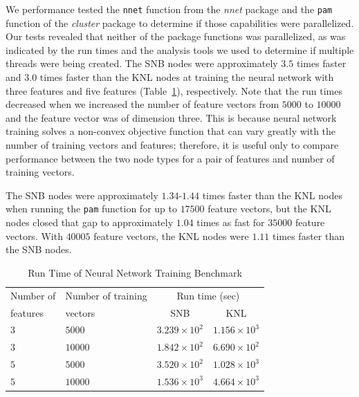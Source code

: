 We performance tested the \texttt{nnet} function from the \textit{nnet} package
  and the \texttt{pam} function of the \textit{cluster} package to determine if
  those capabilities were parallelized.
Our tests revealed that neither of the package functions was parallelized, as
  was indicated by the run times and the analysis tools we used to determine if
  multiple threads were being created.
The SNB nodes were approximately $3.5$ times faster and $3.0$ times
  faster than the KNL nodes at training the neural network with
  three features and five features (Table~\ref{tab:nnetResults}), respectively.
Note that the run times decreased when we increased the number of feature
  vectors from $5000$ to $10000$ and the feature vector was of dimension three.
This is because neural network training solves a non-convex objective function
  that can vary greatly with the number of training vectors and features;
  therefore, it is useful only to compare performance between the two node types
  for a pair of features and number of training vectors.

The SNB nodes were approximately $1.34$-$1.44$ times faster than the KNL nodes
  when running the \texttt{pam} function for up to $17500$ feature vectors, but the KNL
  nodes closed that gap to approximately $1.04$ times as fast for $35000$
  feature vectors.
With $40005$ feature vectors, the KNL nodes were $1.11$ times faster than the
  SNB nodes.

\begin{table}
  \caption{Run Time of Neural Network Training Benchmark}
  \label{tab:nnetResults}
  \begin{tabular}{llcc}
    \toprule
      Number of & Number of training & \multicolumn{2}{c}{Run time (sec)}\\
      features  & vectors            & SNB & KNL\\
    \midrule
    $3$ & $5000$  & $3.239\times 10^{2}$ & $1.156\times 10^{3}$ \\
    $3$ & $10000$ & $1.842\times 10^{2}$ & $6.690\times 10^{2}$ \\
    $5$ & $5000$  & $3.520\times 10^{2}$ & $1.028\times 10^{3}$ \\
    $5$ & $10000$ & $1.536\times 10^{3}$ & $4.664\times 10^{3}$ \\
    \bottomrule
  \end{tabular}
\end{table}

